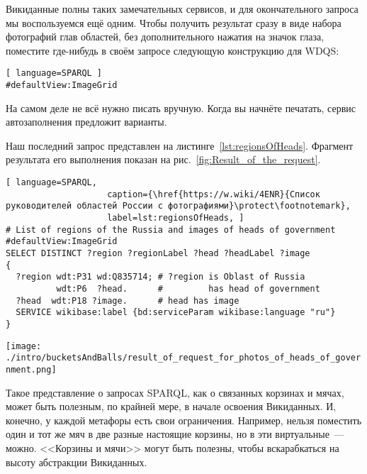 Викиданные полны таких замечательных сервисов, и для окончательного запроса мы воспользуемся ещё одним. Чтобы получить результат сразу в виде набора фотографий глав областей, без дополнительного нажатия на значок глаза, поместите где-нибудь в своём запросе следующую конструкцию для WDQS:
\begin{lstlisting}[ language=SPARQL ]
#defaultView:ImageGrid
\end{lstlisting}

На самом деле не всё нужно писать вручную. Когда вы начнёте печатать, сервис автозаполнения предложит варианты.

Наш последний запрос представлен на листинге~\ref{lst:regionsOfHeads}. Фрагмент результата его выполнения показан на рис.~\ref{fig:Result_of_the_request}.

\lstset{numbers=left, firstnumber=1, frame=single}
\begin{lstlisting}[ language=SPARQL, 
                    caption={\href{https://w.wiki/4ENR}{Список руководителей областей России с фотографиями}\protect\footnotemark}, 
                    label=lst:regionsOfHeads, ]
# List of regions of the Russia and images of heads of government
#defaultView:ImageGrid
SELECT DISTINCT ?region ?regionLabel ?head ?headLabel ?image
{
  ?region wdt:P31 wd:Q835714; # ?region is Oblast of Russia
          wdt:P6  ?head.      #         has head of government
  ?head  wdt:P18 ?image.      # head has image
  SERVICE wikibase:label {bd:serviceParam wikibase:language "ru"} 
}
\end{lstlisting}

\begin{figure*}[h!]
\texttt{[image: ./intro/bucketsAndBalls/result\_of\_request\_for\_photos\_of\_heads\_of\_government.png]}
    \caption{Результат запроса~\protect\ref{lst:regionsOfHeads} в виде сетки изображений.}
    \label{fig:Result_of_the_request}
\end{figure*}

Такое представление о запросах SPARQL, как о связанных корзинах и мячах, может быть полезным, по крайней мере, в начале освоения Викиданных. И, конечно, у каждой метафоры есть свои ограничения. Например, нельзя поместить один и тот же мяч в две разные настоящие корзины, но в эти виртуальные~--- можно. <<Корзины и мячи>> могут быть полезны, чтобы вскарабкаться на высоту абстракции Викиданных.
